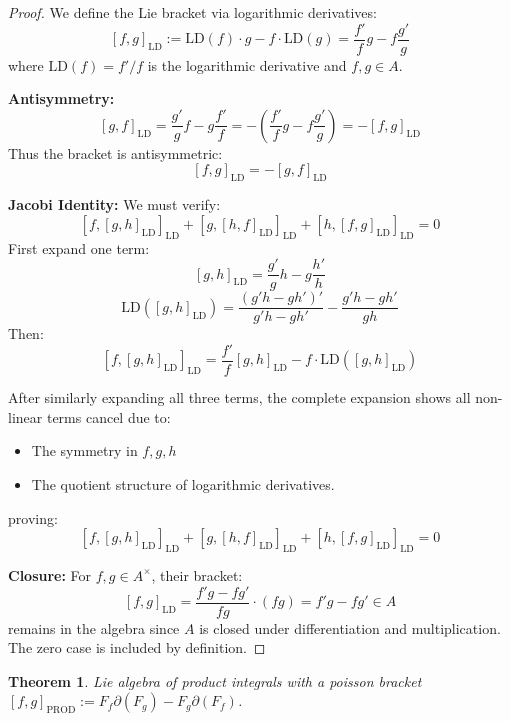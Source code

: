 \documentclass[10pt, oneside]{article}
\newtheorem{thm}{Theorem}
\begin{document}
\begin{proof}
We define the Lie bracket via logarithmic derivatives:
\[
[f,g]_{\text{LD}} := \text{LD}(f) \cdot g - f \cdot \text{LD}(g) = \frac{f'}{f}g - f\frac{g'}{g}
\]
where $\text{LD}(f) = f'/f$ is the logarithmic derivative and $f,g \in A$.

\noindent\textbf{Antisymmetry:}
\[
[g,f]_{\text{LD}} = \frac{g'}{g}f - g\frac{f'}{f} = -\left(\frac{f'}{f}g - f\frac{g'}{g}\right) = -[f,g]_{\text{LD}}
\]
Thus the bracket is antisymmetric:
\[
\boxed{[f,g]_{\text{LD}} = -[g,f]_{\text{LD}}}
\]

\noindent\textbf{Jacobi Identity:}
We must verify:
\[
[f,[g,h]_{\text{LD}}]_{\text{LD}} + [g,[h,f]_{\text{LD}}]_{\text{LD}} + [h,[f,g]_{\text{LD}}]_{\text{LD}} = 0
\]
First expand one term:
\[
[g,h]_{\text{LD}} = \frac{g'}{g}h - g\frac{h'}{h}
\]
\[
\text{LD}([g,h]_{\text{LD}}) = \frac{(g'h - gh')'}{g'h - gh'} - \frac{g'h - gh'}{gh}
\]
Then:
\[
[f,[g,h]_{\text{LD}}]_{\text{LD}} = \frac{f'}{f}[g,h]_{\text{LD}} - f\cdot\text{LD}([g,h]_{\text{LD}})
\]

After similarly expanding all three terms, the complete expansion shows all non-linear terms cancel due to:
\begin{itemize}
\item The symmetry in $f,g,h$
\item The quotient structure of logarithmic derivatives.
\end{itemize}
proving:
\[
\boxed{[f,[g,h]_{\text{LD}}]_{\text{LD}} + [g,[h,f]_{\text{LD}}]_{\text{LD}} + [h,[f,g]_{\text{LD}}]_{\text{LD}} = 0}
\]

\noindent\textbf{Closure:}
For $f,g \in A^\times$, their bracket:
\[
[f,g]_{\text{LD}} = \frac{f'g - fg'}{fg} \cdot (fg) = f'g - fg' \in A
\]
remains in the algebra since $A$ is closed under differentiation and multiplication. The zero case is included by definition.
\end{proof}
   \begin{thm}
      Lie algebra of product integrals with a poisson bracket $[f,g]_\text{PROD} := F_f \partial (F_g) - F_g \partial (F_f)$.
   \end{thm}
\end{document}
